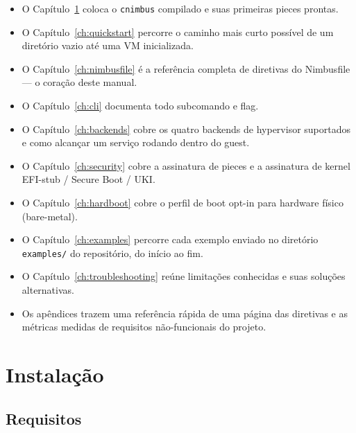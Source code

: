 \documentclass[11pt,letterpaper]{report}
\begin{document}
\begin{itemize}
  \item O Capítulo~\ref{ch:install} coloca o \texttt{cnimbus} compilado
    e suas primeiras pieces prontas.
  \item O Capítulo~\ref{ch:quickstart} percorre o caminho mais curto
    possível de um diretório vazio até uma VM inicializada.
  \item O Capítulo~\ref{ch:nimbusfile} é a referência completa de
    diretivas do Nimbusfile --- o coração deste manual.
  \item O Capítulo~\ref{ch:cli} documenta todo subcomando e flag.
  \item O Capítulo~\ref{ch:backends} cobre os quatro backends de
    hypervisor suportados e como alcançar um serviço rodando dentro do
    guest.
  \item O Capítulo~\ref{ch:security} cobre a assinatura de pieces e a
    assinatura de kernel EFI-stub / Secure Boot / UKI.
  \item O Capítulo~\ref{ch:hardboot} cobre o perfil de boot opt-in para
    hardware físico (bare-metal).
  \item O Capítulo~\ref{ch:examples} percorre cada exemplo enviado no
    diretório \texttt{examples/} do repositório, do início ao fim.
  \item O Capítulo~\ref{ch:troubleshooting} reúne limitações conhecidas
    e suas soluções alternativas.
  \item Os apêndices trazem uma referência rápida de uma página das
    diretivas e as métricas medidas de requisitos não-funcionais do
    projeto.
\end{itemize}

\chapter{Instalação}
\label{ch:install}

\section{Requisitos}
\end{document}
